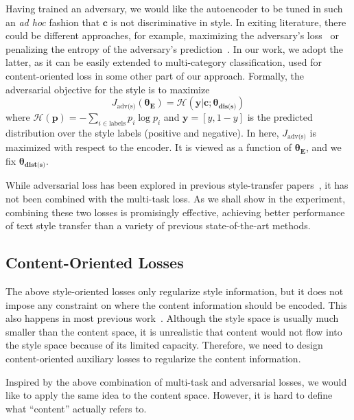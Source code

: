 \documentclass[letterpaper]{article} %
\newcommand{\loss}[1]{J_{\text{#1}}}
\newcommand{\nnweight}[1]{\bm{\theta_{\text{#1}}}}
\begin{document}
Having trained an adversary, we would like the autoencoder to be tuned in such an \textit{ad hoc} fashion that $\bm c$ is not discriminative in style. In exiting literature, there could be different approaches, for example, maximizing the adversary's loss~\cite{shen2017style,zhao2018adversarially} or penalizing the entropy  of the adversary's prediction~\cite{fu2018style}. In our work, we adopt the latter, as it can be easily extended to multi-category classification, used for content-oriented loss in some other part of our approach. Formally, the adversarial objective for the style is to maximize
\begin{equation}
	\loss{adv(s)}(\nnweight{E})=\mathcal{H}(\bm y|\bm c; \nnweight{dis(s)})\label{eqn:advs}
\end{equation}
where $\mathcal{H}(\bm p)=-\sum_{i\in\text{labels}}p_i\log p_i$ and $\bm y=[y, 1-y]$ is the predicted distribution over the style labels (positive and negative). In here, $\loss{adv(s)}$ is maximized with respect to the encoder. It is viewed as a function of $\nnweight{E}$, and we fix $\nnweight{dist(s)}$.

While adversarial loss has been explored in previous style-transfer papers~\cite{shen2017style,fu2018style,zhao2018adversarially}, it has not been combined with the multi-task loss. As we shall show in the experiment, combining these two losses is promisingly effective, achieving better performance of text style transfer than a variety of previous state-of-the-art methods.

\subsection{Content-Oriented Losses}

The above style-oriented losses only regularize style information, but it does not impose any constraint on where the content information should be encoded. This also happens in most previous work~\cite{hu2017toward,shen2017style,fu2018style,zhao2018adversarially}.
Although the style space is usually much smaller than the content space, it is unrealistic that content would not flow into the style space because of its limited capacity. Therefore, we need to design content-oriented auxiliary losses to regularize the content information.

Inspired by the above combination of multi-task and adversarial losses, we would like to apply the same idea to the content space. However, it is hard to define what ``content'' actually refers to.
\end{document}
